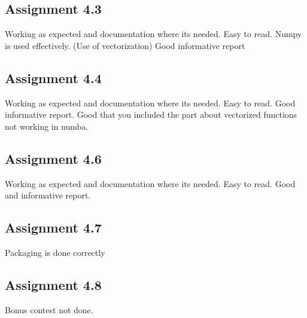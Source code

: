 \documentclass[a4paper]{article}
\begin{document}
\subsection*{Assignment 4.3}

Working as expected and documentation where its needed.
Easy to read.
Numpy is used effectively. (Use of vectorization)
Good informative report

\subsection*{Assignment 4.4}

Working as expected and documentation where its needed.
Easy to read. Good informative report. Good that you included the part about vectorized functions not working in numba.

\subsection*{Assignment 4.6}

Working as expected and documentation where its needed.
Easy to read. Good and informative report.

\subsection*{Assignment 4.7}
Packaging is done correctly

\subsection*{Assignment 4.8}
Bonus contest not done.



\end{document}
